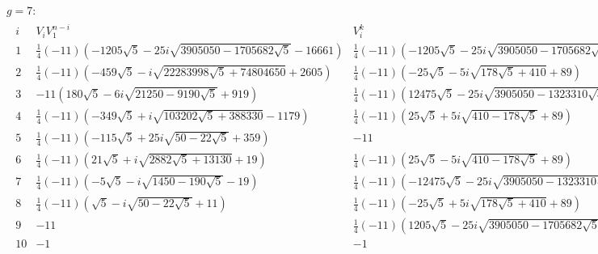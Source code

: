 \documentclass{article}
\renewcommand\({\left(}
\renewcommand\){\right)}
\begin{document}
\begin{landscape}
$g=7$:
\begin{align*}
    \begin{array}{c|c|c|c|c|c}
        i&V_iV_1^{n-i}&V_i^k&k&q\\
        \hline
        1 & \frac{1}{4} (-11) \left(-1205 \sqrt{5}-25 i \sqrt{3905050-1705682 \sqrt{5}}-16661\right) & \frac{1}{4} (-11) \left(-1205 \sqrt{5}-25 i \sqrt{3905050-1705682 \sqrt{5}}-16661\right) & 10 & 6 \\
        2 & \frac{1}{4} (-11) \left(-459 \sqrt{5}-i \sqrt{22283998 \sqrt{5}+74804650}+2605\right) & \frac{1}{4} (-11) \left(-25 \sqrt{5}-5 i \sqrt{178 \sqrt{5}+410}+89\right) & 5 & 4 \\
        3 & -11 \left(180 \sqrt{5}-6 i \sqrt{21250-9190 \sqrt{5}}+919\right) & \frac{1}{4} (-11) \left(12475 \sqrt{5}-25 i \sqrt{3905050-1323310 \sqrt{5}}-27931\right) & 10 & 2 \\
        4 & \frac{1}{4} (-11) \left(-349 \sqrt{5}+i \sqrt{103202 \sqrt{5}+388330}-1179\right) & \frac{1}{4} (-11) \left(25 \sqrt{5}+5 i \sqrt{410-178 \sqrt{5}}+89\right) & 5 & 0 \\
        5 & \frac{1}{4} (-11) \left(-115 \sqrt{5}+25 i \sqrt{50-22 \sqrt{5}}+359\right) & -11 & 2 & 0 \\
        6 & \frac{1}{4} (-11) \left(21 \sqrt{5}+i \sqrt{2882 \sqrt{5}+13130}+19\right) & \frac{1}{4} (-11) \left(25 \sqrt{5}-5 i \sqrt{410-178 \sqrt{5}}+89\right) & 5 & 4 \\
        7 & \frac{1}{4} (-11) \left(-5 \sqrt{5}-i \sqrt{1450-190 \sqrt{5}}-19\right) & \frac{1}{4} (-11) \left(-12475 \sqrt{5}-25 i \sqrt{3905050-1323310 \sqrt{5}}-30341\right) & 10 & 2 \\
        8 & \frac{1}{4} (-11) \left(\sqrt{5}-i \sqrt{50-22 \sqrt{5}}+11\right) & \frac{1}{4} (-11) \left(-25 \sqrt{5}+5 i \sqrt{178 \sqrt{5}+410}+89\right) & 5 & 0 \\
        9 & -11 & \frac{1}{4} (-11) \left(1205 \sqrt{5}-25 i \sqrt{3905050-1705682 \sqrt{5}}-41611\right) & 10 & 8 \\
        10 & -1 & -1 & 1 & 0 \\
    \end{array}
\end{align*}


\end{landscape}
\end{document}
